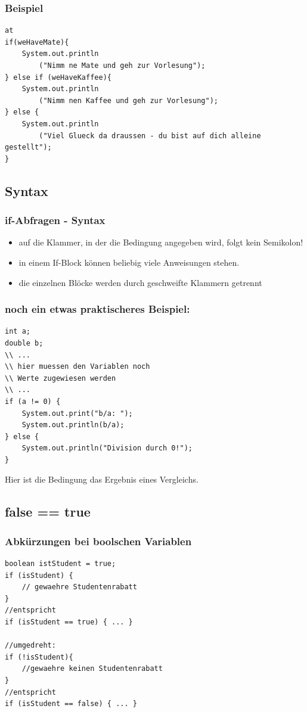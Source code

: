 \documentclass[final]{beamer}
\begin{document}
\begin{frame}[containsverbatim]
	\frametitle{Beispiel}
	\begin{lstlisting}at
if(weHaveMate){
	System.out.println
		("Nimm ne Mate und geh zur Vorlesung");
} else if (weHaveKaffee){
	System.out.println
		("Nimm nen Kaffee und geh zur Vorlesung");
} else {
	System.out.println
		("Viel Glueck da draussen - du bist auf dich alleine gestellt");
}
	\end{lstlisting}
\end{frame}

\subsection{Syntax}
\begin{frame}
	\frametitle{if-Abfragen - Syntax}
	\begin{itemize}
		\item{auf die Klammer, in der die Bedingung angegeben wird, folgt kein Semikolon!}
		\item{in einem If-Block können beliebig viele Anweisungen stehen.}
		\item{die einzelnen Blöcke werden durch geschweifte Klammern getrennt}
	\end{itemize}
\end{frame}

\begin{frame}[containsverbatim]
	\frametitle{noch ein etwas praktischeres Beispiel:}
	\begin{lstlisting}
int a;
double b;
\\ ...
\\ hier muessen den Variablen noch
\\ Werte zugewiesen werden
\\ ...
if (a != 0) {
	System.out.print("b/a: ");
	System.out.println(b/a);
} else {
	System.out.println("Division durch 0!");
}
	\end{lstlisting}
	Hier ist die Bedingung das Ergebnis eines Vergleichs.
\end{frame}

\subsection{false == true}
\begin{frame}[containsverbatim]
	\frametitle{Abkürzungen bei boolschen Variablen}
	\begin{lstlisting}
boolean istStudent = true;
if (isStudent) {
	// gewaehre Studentenrabatt
}
//entspricht
if (isStudent == true) { ... }

//umgedreht:
if (!isStudent){
	//gewaehre keinen Studentenrabatt
}
//entspricht
if (isStudent == false) { ... }
	\end{lstlisting}
\end{frame}
\end{document}
